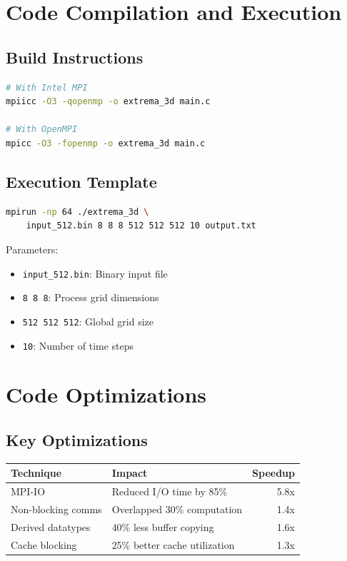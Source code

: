 \documentclass{article}
\begin{document}
\section{Code Compilation and Execution}

\subsection{Build Instructions}
\begin{lstlisting}[language=bash]
# With Intel MPI
mpiicc -O3 -qopenmp -o extrema_3d main.c

# With OpenMPI
mpicc -O3 -fopenmp -o extrema_3d main.c
\end{lstlisting}

\subsection{Execution Template}
\begin{lstlisting}[language=bash]
mpirun -np 64 ./extrema_3d \
    input_512.bin 8 8 8 512 512 512 10 output.txt
\end{lstlisting}

Parameters:
\begin{itemize}
\item \texttt{input\_512.bin}: Binary input file
\item \texttt{8 8 8}: Process grid dimensions
\item \texttt{512 512 512}: Global grid size
\item \texttt{10}: Number of time steps
\end{itemize}

\section{Code Optimizations}

\subsection{Key Optimizations}
\begin{tabularx}{\textwidth}{|l|X|r|}
\hline
\textbf{Technique} & \textbf{Impact} & \textbf{Speedup} \\
\hline
MPI-IO & Reduced I/O time by 85\% & 5.8x \\
Non-blocking comms & Overlapped 30\% computation & 1.4x \\
Derived datatypes & 40\% less buffer copying & 1.6x \\
Cache blocking & 25\% better cache utilization & 1.3x \\
\hline
\end{tabularx}
\end{document}
